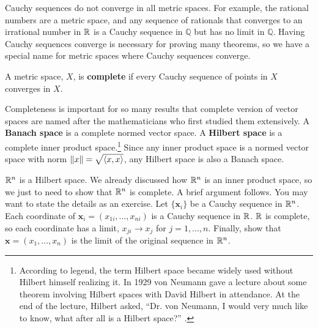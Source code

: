 Cauchy sequences do not converge in all metric spaces. For example,
the rational numbers are a metric space, and any sequence of rationals
that converges to an irrational number in $\mathbb{R}$ is a Cauchy sequence in
$\mathbb{Q}$ but has no limit in $\mathbb{Q}$. Having Cauchy sequences
converge is necessary for proving many theorems, so we have a special
name for metric spaces where Cauchy sequences converge.
\begin{definition}
  A metric space, $X$, is \textbf{complete} if every Cauchy sequence of
  points in $X$ converges in $X$.
\end{definition}
Completeness is important for so many results that complete version of
vector spaces are named after the mathematicians who first studied
them extensively. A \textbf{Banach space} is a complete normed vector
space. A \textbf{Hilbert space} is a complete inner product
space.\footnote{According to legend, the term Hilbert space became
  widely used without Hilbert himself realizing it. In 1929 von Neumann gave a lecture
  about some theorem involving Hilbert spaces with David Hilbert in
  attendance. At the end of the lecture, Hilbert asked, ``Dr. von
  Neumann, I would very much like to know, what after all is a Hilbert
  space?'' \cite{krantz2002}.} Since any inner product space is a normed vector space with
norm $\left\Vert {x} \right\Vert = \sqrt{\left\langle {x} , {x} \right\rangle}$, any Hilbert space is also a
Banach space. 
\begin{example}
  $\mathbb{R}^n$ is a Hilbert space. We already discussed how $\mathbb{R}^n$ is an
  inner product space, so we just to need to show that $\mathbb{R}^n$ is
  complete. A brief argument follows. You may want to state the
  details as an exercise. Let $\{\mathbf{x}_i\}$ be a Cauchy sequence
  in $\mathbb{R}^n$. Each coordinate of $\mathbf{x}_i = (x_{1i}, ... ,
  x_{ni})$ is a Cauchy sequence in $\mathbb{R}$. $\mathbb{R}$ is complete, so each
  coordinate has a limit, $x_{ji} \to x_j$ for $j = 1, ...,
  n$. Finally, show that $\mathbf{x} = (x_1, ..., x_n)$ is the limit
  of the original sequence in $\mathbb{R}^n$.
\end{example}
